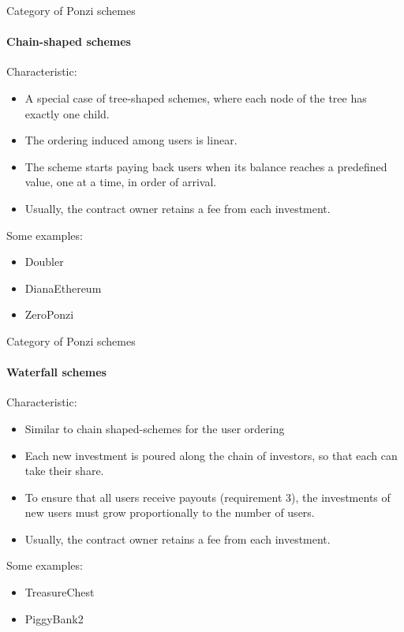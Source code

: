 \documentclass[aspectratio=169,10pt]{beamer}
\begin{document}
\begin{frame}{Category of Ponzi schemes}
\framesubtitle{Chain-shaped schemes}

Characteristic:
\begin{itemize}
\item A special case of tree-shaped schemes, where each node of the tree has exactly one child.
\item The ordering induced among users is linear.
\item The scheme starts paying back users when its balance reaches a predefined value, one at a time, in order of arrival.
\item Usually, the contract owner retains a fee from each investment.
\end{itemize} \bigskip

Some examples:
\begin{itemize}
\item Doubler
\item DianaEthereum
\item ZeroPonzi
\end{itemize}

\end{frame}

\begin{frame}{Category of Ponzi schemes}
\framesubtitle{Waterfall schemes}

Characteristic:
\begin{itemize}
\item Similar to chain shaped-schemes for the user ordering
\item Each new investment is poured
along the chain of investors, so that each can take their share.
\item To ensure that all users receive payouts (requirement 3),
the investments of new users must grow proportionally to the number of users.
\item Usually, the contract owner retains a fee from each investment.
\end{itemize} \bigskip

Some examples:
\begin{itemize}
\item TreasureChest
\item PiggyBank2
\end{itemize}

\end{frame}
\end{document}
